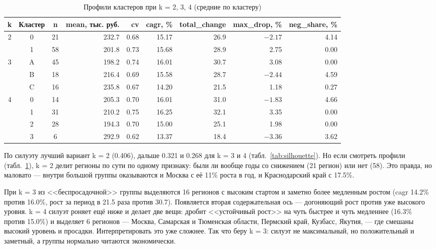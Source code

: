 \documentclass[12pt,a4paper]{report}
\begin{document}
\begin{table}[H]
\centering
\caption{Профили кластеров при k = 2, 3, 4 (средние по кластеру)}
\label{tab:profiles_k}
\small
\begin{tabular}{cccrrrrrr}
\toprule
k & Кластер & n & mean, тыс. руб. & cv & cagr, \% & total\_change & max\_drop, \% & neg\_share, \% \\
\midrule
2 & 0 & 21 & 232.7 & 0.68 & 15.17 & 26.9 & $-2.17$ & 4.14 \\
  & 1 & 58 & 201.8 & 0.73 & 15.68 & 28.9 & 2.75 & 0.00 \\
\midrule
3 & A & 45 & 198.2 & 0.74 & 16.01 & 30.7 & 3.08 & 0.00 \\
  & B & 18 & 216.4 & 0.69 & 15.58 & 28.7 & $-2.44$ & 4.59 \\
  & C & 16 & 235.8 & 0.67 & 14.20 & 21.5 & 1.18 & 0.27 \\
\midrule
4 & 0 & 14 & 205.3 & 0.70 & 16.01 & 31.0 & $-1.83$ & 4.66 \\
  & 1 & 31 & 210.2 & 0.75 & 16.25 & 32.1 & 3.35 & 0.00 \\
  & 2 & 28 & 194.3 & 0.70 & 15.00 & 25.1 & 1.98 & 0.00 \\
  & 3 & 6 & 292.9 & 0.62 & 13.37 & 18.4 & $-3.36$ & 3.62 \\
\bottomrule
\end{tabular}
\end{table}

По силуэту лучший вариант k = 2 (0.406), дальше 0.321 и 0.268 для k = 3 и 4 (табл.~\ref{tab:silhouette}). Но если смотреть профили (табл.~\ref{tab:profiles_k}), k = 2 делит регионы по сути по одному признаку: были ли вообще годы со снижением (21 регион) или нет (58). Это правда, но маловато --- внутри большой группы оказываются и Москва с её 11\% роста в год, и Краснодарский край с 17.5\%.

При k = 3 из <<беспросадочной>> группы выделяются 16 регионов с высоким стартом и заметно более медленным ростом (cagr 14.2\% против 16.0\%, рост за период в 21.5 раза против 30.7). Появляется вторая содержательная ось --- догоняющий рост против уже высокого уровня. k = 4 силуэт роняет ещё ниже и делает две вещи: дробит <<устойчивый рост>> на чуть быстрее и чуть медленнее (16.3\% против 15.0\%) и выделяет 6 регионов --- Москва, Самарская и Тюменская области, Пермский край, Кузбасс, Якутия, --- где смешаны высокий уровень и просадки. Интерпретировать это уже сложнее. Так что беру k = 3: силуэт не максимальный, но положительный и заметный, а группы нормально читаются экономически.
\end{document}
